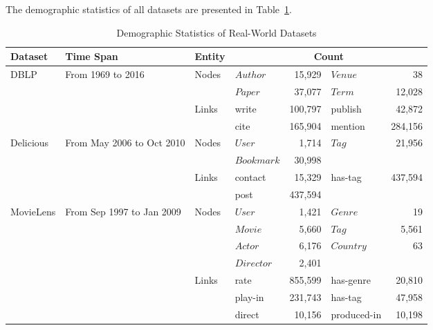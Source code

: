 The demographic statistics of all datasets are presented in Table~\ref{table:dataset}.


\begin{table}[t]
	\centering
	\caption{Demographic Statistics of Real-World Datasets}
	\label{table:dataset}
	\footnotesize
	\begin{tabular} {l l l l r l r}
		\toprule
		Dataset & Time Span & Entity & \multicolumn{4}{c}{Count}\\
		\midrule %
		\multirow{4}{*}{DBLP} & \multirow{4}{*}{From 1969 to 2016}
		& \multirow{2}{*}{Nodes}
		& $Author$ & 15,929 & $Venue$ & 38 \\ %
		& & & $Paper$ & 37,077 & $Term$ & 12,028 \\ %
		\cmidrule{3-7}
		& & \multirow{2}{*}{Links}
		& write & 100,797 & publish & 42,872 \\ %
		& & & cite & 165,904 & mention & 284,156 \\ %
		
		\midrule %
		\multirow{4}{*}{Delicious} & \multirow{4}{*}{From May 2006 to Oct 2010}
		& \multirow{2}{*}{Nodes}
		& $User$ & 1,714 & $Tag$ & 21,956 \\ %
		& & & $Bookmark$ & 30,998 & & \\ %
		\cmidrule{3-7}
		& & \multirow{2}{*}{Links}
		& contact & 15,329 & has-tag & 437,594 \\ %
		& & & post & 437,594 & & \\ %
		
		\midrule %
		\multirow{7}{*}{MovieLens} & \multirow{7}{*}{From Sep 1997 to Jan 2009}
		& \multirow{4}{*}{Nodes}
		& $User$ & 1,421 & $Genre$ & 19 \\ %
		& & & $Movie$ & 5,660 & $Tag$ & 5,561 \\ %
		& & & $Actor$ & 6,176 & $Country$ & 63 \\ %
		& & & $Director$ & 2,401 & & \\ %
		\cmidrule{3-7}
		& & \multirow{3}{*}{Links}
		& rate & 855,599 & has-genre & 20,810 \\ %
		& & & play-in & 231,743 & has-tag & 47,958 \\ %
		& & & direct & 10,156 & produced-in & 10,198 \\ %
		\bottomrule %
	\end{tabular}
\end{table}

